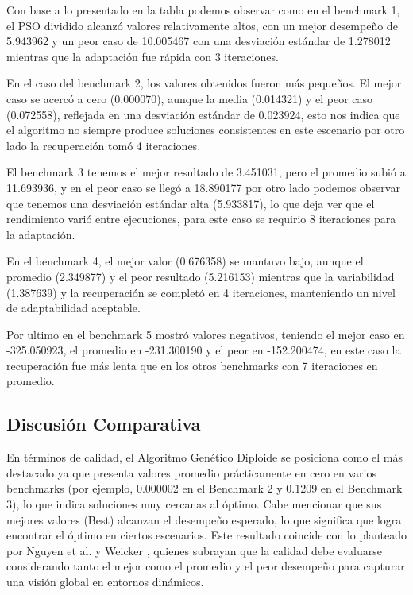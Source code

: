 \documentclass[10pt]{article}
\begin{document}
Con base a lo presentado en la tabla podemos observar como en el benchmark 1, el PSO dividido alcanzó valores relativamente altos, con un mejor desempeño de 5.943962 y un peor caso de 10.005467 con una desviación estándar de 1.278012 mientras que la adaptación fue rápida con 3 iteraciones.

En el caso del benchmark 2, los valores obtenidos fueron más pequeños. El mejor caso se acercó a cero (0.000070), aunque la media (0.014321) y el peor caso (0.072558), reflejada en una desviación estándar de 0.023924, esto nos indica que el algoritmo no siempre produce soluciones consistentes en este escenario por otro lado la recuperación tomó 4 iteraciones.

El benchmark 3 tenemos el mejor resultado de 3.451031, pero el promedio subió a 11.693936, y en el peor caso se llegó a 18.890177 por otro lado podemos observar que tenemos una desviación estándar alta (5.933817), lo que deja ver que el rendimiento varió entre ejecuciones, para este caso se requirio 8 iteraciones para la adaptación.

En el benchmark 4, el mejor valor (0.676358) se mantuvo bajo, aunque el promedio (2.349877) y el peor resultado (5.216153) mientras que la variabilidad (1.387639) y la recuperación se completó en 4 iteraciones, manteniendo un nivel de adaptabilidad aceptable.

Por ultimo en el benchmark 5 mostró valores negativos, teniendo el mejor caso en -325.050923, el promedio en -231.300190 y el peor en -152.200474, en este caso la recuperación fue más lenta que en los otros benchmarks con 7 iteraciones en promedio.

\subsection*{Discusión Comparativa}

En términos de calidad, el Algoritmo Genético Diploide se posiciona como el más destacado ya que presenta valores promedio prácticamente en cero en varios benchmarks (por ejemplo, 0.000002 en el Benchmark 2 y 0.1209 en el Benchmark 3), lo que indica soluciones muy cercanas al óptimo. Cabe mencionar que sus mejores valores (Best) alcanzan el desempeño esperado, lo que significa que logra encontrar el óptimo en ciertos escenarios. Este resultado coincide con lo planteado por Nguyen et al. \cite{nguyen2012survey} y Weicker \cite{weicker2003performance}, quienes subrayan que la calidad debe evaluarse considerando tanto el mejor como el promedio y el peor desempeño para capturar una visión global en entornos dinámicos.
\end{document}
